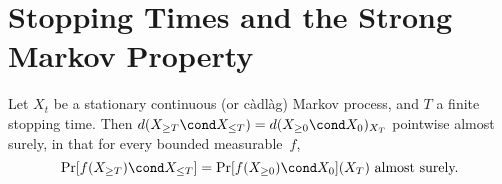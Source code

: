 \section	{Stopping Times and the Strong Markov Property}


\begin	{theorem}
Let $X_t$ be a stationary continuous (or càdlàg) Markov process,
and $T$ a finite stopping time.
Then \( d(X_{\ge T}\cond X_{\le T}) = d(X_{\ge 0}\cond X_0)_{X_T} \)
pointwise almost surely,
in that for every bounded measurable~$f$,
\[ \text{\( \Pr[f(X_{\ge T})\cond X_{\le T}]
	=  \Pr[f(X_{\ge 0})\cond X_0](X_T) \)
	almost surely.} \]
\end	{theorem}
